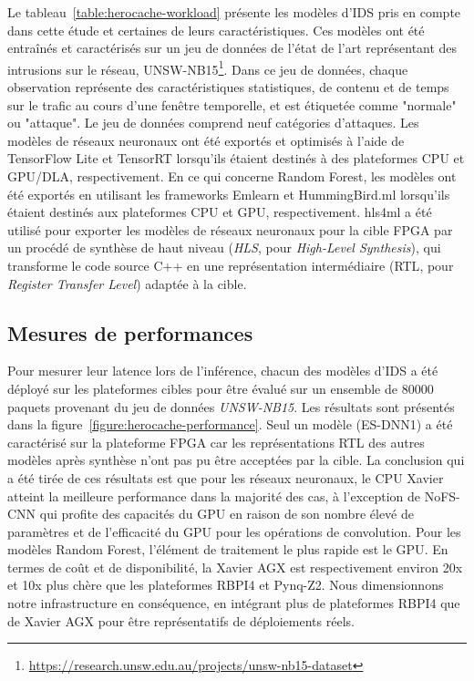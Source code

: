 {Le tableau~\ref{table:herocache-workload} présente les modèles d'\gls{IDS} pris en compte dans cette étude et certaines de leurs caractéristiques. Ces modèles ont été entraînés et caractérisés sur un jeu de données de l'état de l'art représentant des intrusions sur le réseau, UNSW-NB15\footnote{\href{https://research.unsw.edu.au/projects/unsw-nb15-dataset}{https://research.unsw.edu.au/projects/unsw-nb15-dataset}}. Dans ce jeu de données, chaque observation représente des caractéristiques statistiques, de contenu et de temps sur le trafic au cours d'une fenêtre temporelle, et est étiquetée comme "normale" ou "attaque". Le jeu de données comprend neuf catégories d'attaques. Les modèles de réseaux neuronaux ont été exportés et optimisés à l'aide de TensorFlow Lite et TensorRT lorsqu'ils étaient destinés à des plateformes \gls{CPU} et \gls{GPU}/\gls{DLA}, respectivement. En ce qui concerne Random Forest, les modèles ont été exportés en utilisant les frameworks Emlearn et HummingBird.ml lorsqu'ils étaient destinés aux plateformes \gls{CPU} et \gls{GPU}, respectivement. hls4ml a été utilisé pour exporter les modèles de réseaux neuronaux pour la cible \gls{FPGA} par un procédé de synthèse de haut niveau (\textit{HLS}, pour \textit{High-Level Synthesis}), qui transforme le code source C++ en une représentation intermédiaire (\gls{RTL}, pour \textit{Register Transfer Level}) adaptée à la cible.

\subsection{Mesures de performances}

Pour mesurer leur latence lors de l'inférence, chacun des modèles d'\gls{IDS} a été déployé sur les plateformes cibles pour être évalué sur un ensemble de $80 000$ paquets provenant du jeu de données \textit{UNSW-NB15}. Les résultats sont présentés dans la figure~\ref{figure:herocache-performance}. Seul un modèle (ES-DNN1) a été caractérisé sur la plateforme \gls{FPGA} car les représentations RTL des autres modèles après synthèse n'ont pas pu être acceptées par la cible. La conclusion qui a été tirée de ces résultats est que pour les réseaux neuronaux, le \gls{CPU} Xavier atteint la meilleure performance dans la majorité des cas, à l'exception de NoFS-CNN qui profite des capacités du \gls{GPU} en raison de son nombre élevé de paramètres et de l'efficacité du \gls{GPU} pour les opérations de convolution. Pour les modèles Random Forest, l'élément de traitement le plus rapide est le \gls{GPU}. En termes de coût et de disponibilité, la Xavier AGX est respectivement environ 20x et 10x plus chère que les plateformes RBPI4 et Pynq-Z2. Nous dimensionnons notre infrastructure en conséquence, en intégrant plus de plateformes RBPI4 que de Xavier AGX pour être représentatifs de déploiements réels.

}
